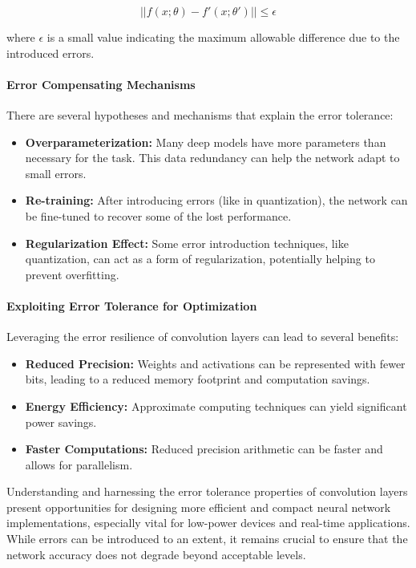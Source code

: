 \begin{equation}
||f(x; \theta) - f'(x; \theta')|| \leq \epsilon
\end{equation}

where \( \epsilon \) is a small value indicating the maximum allowable difference due to the introduced errors.

\paragraph{Error Compensating Mechanisms}

There are several hypotheses and mechanisms that explain the error tolerance:

\begin{itemize}
	\item \textbf{Overparameterization:} Many deep models have more parameters than necessary for the task. This data redundancy can help the network adapt to small errors.
	\item \textbf{Re-training:} After introducing errors (like in quantization), the network can be fine-tuned to recover some of the lost performance.
	\item \textbf{Regularization Effect:} Some error introduction techniques, like quantization, can act as a form of regularization, potentially helping to prevent overfitting.
\end{itemize}

\paragraph{Exploiting Error Tolerance for Optimization}

Leveraging the error resilience of convolution layers can lead to several benefits:

\begin{itemize}
	\item \textbf{Reduced Precision:} Weights and activations can be represented with fewer bits, leading to a reduced memory footprint and computation savings.
	\item \textbf{Energy Efficiency:} Approximate computing techniques can yield significant power savings.
	\item \textbf{Faster Computations:} Reduced precision arithmetic can be faster and allows for parallelism.
\end{itemize}

Understanding and harnessing the error tolerance properties of convolution layers present opportunities for designing more efficient and compact neural network implementations, especially vital for low-power devices and real-time applications. While errors can be introduced to an extent, it remains crucial to ensure that the network accuracy does not degrade beyond acceptable levels.


